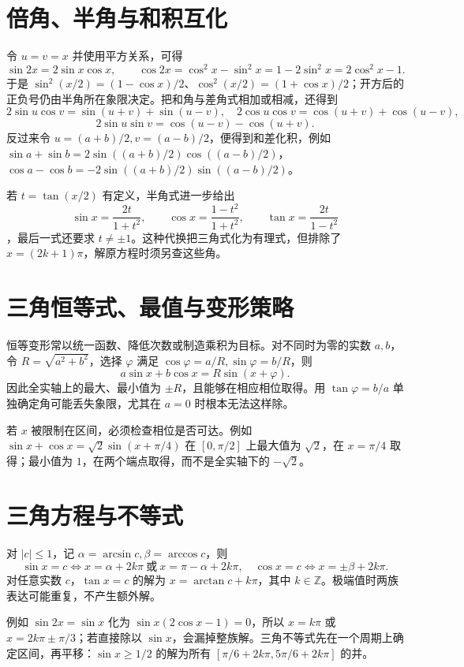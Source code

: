 \documentclass[UTF8]{ctexbook}
\begin{document}
\section{倍角、半角与和积互化}
令 $u=v=x$ 并使用平方关系，可得
\[
 \sin2x=2\sin x\cos x,\qquad
 \cos2x=\cos^2x-\sin^2x=1-2\sin^2x=2\cos^2x-1.
\]
于是 $\sin^2(x/2)=(1-\cos x)/2$、$\cos^2(x/2)=(1+\cos x)/2$；开方后的正负号仍由半角所在象限决定。把和角与差角式相加或相减，还得到
\[
 2\sin u\cos v=\sin(u+v)+\sin(u-v),\quad
 2\cos u\cos v=\cos(u+v)+\cos(u-v),
\]
\[
 2\sin u\sin v=\cos(u-v)-\cos(u+v).
\]
反过来令 $u=(a+b)/2,v=(a-b)/2$，便得到和差化积，例如
$\sin a+\sin b=2\sin((a+b)/2)\cos((a-b)/2)$，
$\cos a-\cos b=-2\sin((a+b)/2)\sin((a-b)/2)$。

若 $t=\tan(x/2)$ 有定义，半角式进一步给出
\[
 \sin x=\frac{2t}{1+t^2},\qquad
 \cos x=\frac{1-t^2}{1+t^2},\qquad
 \tan x=\frac{2t}{1-t^2}
\]
，最后一式还要求 $t\ne\pm1$。这种代换把三角式化为有理式，但排除了 $x=(2k+1)\pi$，解原方程时须另查这些角。

\section{三角恒等式、最值与变形策略}
恒等变形常以统一函数、降低次数或制造乘积为目标。对不同时为零的实数 $a,b$，令 $R=\sqrt{a^2+b^2}$，选择 $\varphi$ 满足 $\cos\varphi=a/R,\sin\varphi=b/R$，则
\[
 a\sin x+b\cos x=R\sin(x+\varphi).
\]
因此全实轴上的最大、最小值为 $\pm R$，且能够在相应相位取得。用 $\tan\varphi=b/a$ 单独确定角可能丢失象限，尤其在 $a=0$ 时根本无法这样除。

若 $x$ 被限制在区间，必须检查相位是否可达。例如 $\sin x+\cos x=\sqrt2\sin(x+\pi/4)$ 在 $[0,\pi/2]$ 上最大值为 $\sqrt2$，在 $x=\pi/4$ 取得；最小值为 $1$，在两个端点取得，而不是全实轴下的 $-\sqrt2$。

\section{三角方程与不等式}
对 $|c|\le1$，记 $\alpha=\arcsin c,\beta=\arccos c$，则
\[
 \sin x=c\Longleftrightarrow x=\alpha+2k\pi\ \text{或}\ x=\pi-\alpha+2k\pi,
 \quad
 \cos x=c\Longleftrightarrow x=\pm\beta+2k\pi.
\]
对任意实数 $c$，$\tan x=c$ 的解为 $x=\arctan c+k\pi$，其中 $k\in\mathbb Z$。极端值时两族表达可能重复，不产生额外解。

例如 $\sin2x=\sin x$ 化为 $\sin x(2\cos x-1)=0$，所以 $x=k\pi$ 或 $x=2k\pi\pm\pi/3$；若直接除以 $\sin x$，会漏掉整族解。三角不等式先在一个周期上确定区间，再平移：$\sin x\ge1/2$ 的解为所有 $[\pi/6+2k\pi,5\pi/6+2k\pi]$ 的并。
\end{document}
